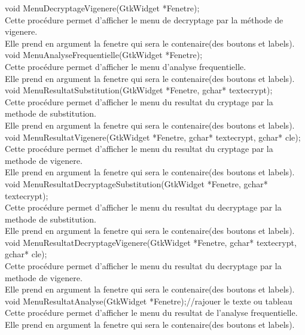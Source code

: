 \documentclass[a4]{article}
\begin{document}
	void MenuDecryptageVigenere(GtkWidget *Fenetre);\\
		Cette procédure permet d'afficher le menu de decryptage par la méthode de vigenere.\\
		Elle prend en argument la fenetre qui sera le contenaire(des boutons et labels).\\
	
	void MenuAnalyseFrequentielle(GtkWidget *Fenetre);\\
		Cette procédure permet d'afficher le menu d'analyse frequentielle.\\
		Elle prend en argument la fenetre qui sera le contenaire(des boutons et labels).\\
	
	void MenuResultatSubstitution(GtkWidget *Fenetre, gchar* textecrypt);\\
		Cette procédure permet d'afficher le menu du resultat du cryptage par la methode de substitution.\\
		Elle prend en argument la fenetre qui sera le contenaire(des boutons et labels).\\
	
	void MenuResultatVigenere(GtkWidget *Fenetre, gchar* textecrypt, gchar* cle);\\
		Cette procédure permet d'afficher le menu du resultat du cryptage par la methode de vigenere.\\
		Elle prend en argument la fenetre qui sera le contenaire(des boutons et labels).\\
		
	void MenuResultatDecryptageSubstitution(GtkWidget *Fenetre, gchar* textecrypt);\\
		Cette procédure permet d'afficher le menu du resultat du decryptage par la methode de substitution.\\
		Elle prend en argument la fenetre qui sera le contenaire(des boutons et labels).\\
	
	void MenuResultatDecryptageVigenere(GtkWidget *Fenetre, gchar* textecrypt, gchar* cle);\\
		Cette procédure permet d'afficher le menu du resultat du decryptage par la methode de vigenere.\\
		Elle prend en argument la fenetre qui sera le contenaire(des boutons et labels).\\
	
	void MenuResultatAnalyse(GtkWidget *Fenetre);//rajouer le texte ou tableau\\
		Cette procédure permet d'afficher le menu du resultat de l'analyse frequentielle.\\
		Elle prend en argument la fenetre qui sera le contenaire(des boutons et labels).\\
	
\end{document}
